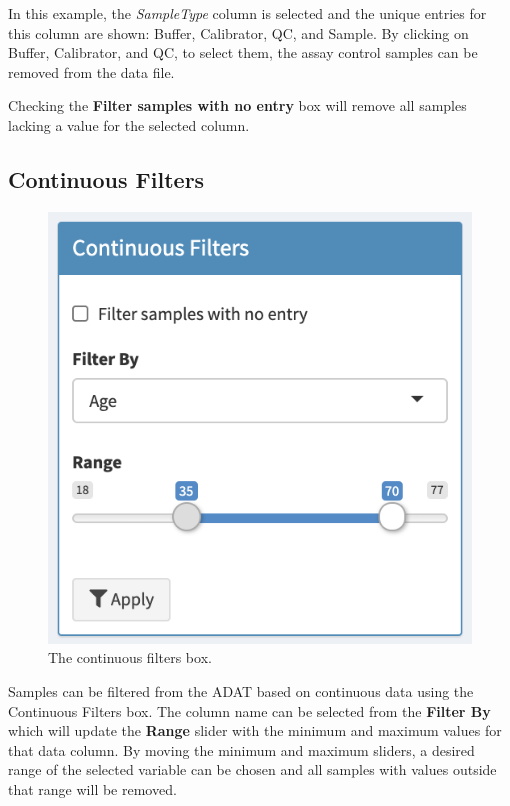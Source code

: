\documentclass[
]{book}
\begin{document}
In this example, the \emph{SampleType} column is selected and the unique entries for this column are shown: Buffer, Calibrator, QC, and Sample. By clicking on Buffer, Calibrator, and QC, to select them, the assay control samples can be removed from the data file.

Checking the \textbf{Filter samples with no entry} box will remove all samples lacking a value for the selected column.

\hypertarget{continuous-filters}{%
\subsection{Continuous Filters}\label{continuous-filters}}

\begin{figure}
\centering
\includegraphics{images/ContinousFilters.png}
\caption{The continuous filters box.}
\end{figure}

Samples can be filtered from the ADAT based on continuous data using the Continuous Filters box. The column name can be selected from the \textbf{Filter By} which will update the \textbf{Range} slider with the minimum and maximum values for that data column. By moving the minimum and maximum sliders, a desired range of the selected variable can be chosen and all samples with values outside that range will be removed.
\end{document}
